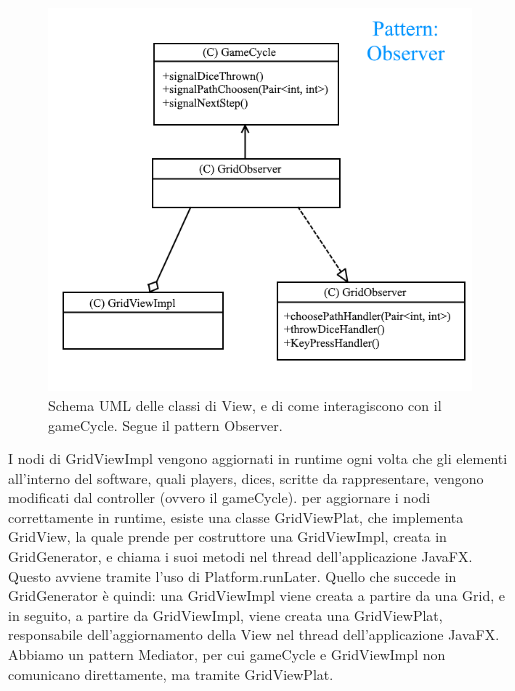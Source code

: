 \documentclass[a4paper,12pt]{report}
\begin{document}
\begin{figure}[!t]
\centering{}
\includegraphics[width=\textwidth]{images/gridImages/gridObserver.png}
\caption{Schema UML delle classi di View, e di come interagiscono con il gameCycle. Segue il pattern Observer.}
\label{img:gridobserver}
\end{figure}

I nodi di GridViewImpl vengono aggiornati in runtime ogni volta che gli elementi all’interno del software, quali players, dices, scritte da rappresentare, vengono modificati dal controller (ovvero il gameCycle).
%
per aggiornare i nodi correttamente in runtime, esiste una classe GridViewPlat, che implementa GridView, la quale prende per costruttore una GridViewImpl, creata in GridGenerator, e chiama i suoi metodi nel thread dell’applicazione JavaFX.
%
Questo avviene tramite l’uso di Platform.runLater.
%
Quello che succede in GridGenerator è quindi: una GridViewImpl viene creata a partire da una Grid, e in seguito, a partire da GridViewImpl, viene creata una GridViewPlat, responsabile dell’aggiornamento della View nel thread dell’applicazione JavaFX.
%
Abbiamo un pattern Mediator, per cui gameCycle e GridViewImpl non comunicano direttamente, ma tramite GridViewPlat.
\end{document}
